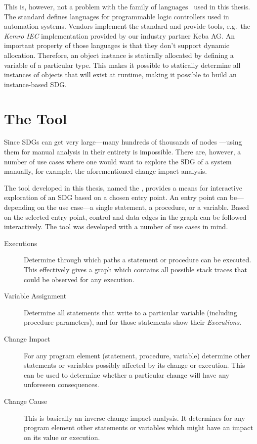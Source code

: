 This is, however, not a problem with the \IEC family of languages~\cite{IEC61131:2003} used in this thesis. The \IEC 
standard defines languages for programmable logic controllers used in automation systems. Vendors implement the 
standard and provide tools, e.g.\ the \emph{Kemro IEC} implementation provided by our industry partner Keba AG. An 
important property of those languages is that they don't support dynamic allocation. Therefore, an object instance is 
statically allocated by defining a variable of a particular type. This makes it possible to statically determine all 
instances of objects that will exist at runtime, making it possible to build an instance-based SDG.


\section{The Tool} \label{sec:intro-tool}

Since SDGs can get very large---many hundreds of thousands of nodes 
\cite[sec.~4.3]{DBLP:conf/splc/AngererPLGG14}---using them for manual analysis in their entirety is impossible. There 
are, however, a number of use cases where one would want to explore the SDG of a system manually, for example, the 
aforementioned change impact analysis.

The tool developed in this thesis, named the \emph{\SB}, provides a means for interactive exploration of an SDG based 
on a chosen entry point. An entry point can be---depending on the use case---a single statement, a procedure, or a 
variable. Based on the selected entry point, control and data edges in the graph can be followed interactively. The 
tool was developed with a number of use cases in mind.

\begin{description}
  \item[Executions] Determine through which paths a statement or procedure can be executed. This effectively gives a 
  graph which contains all possible stack traces that could be observed for any execution.
  
  \item[Variable Assignment] Determine all statements that write to a particular variable (including procedure 
  parameters), and for those statements show their \emph{Executions}.
  
  \item[Change Impact] For any program element (statement, procedure, variable) determine other statements or variables 
  possibly affected by its change or execution. This can be used to determine whether a particular change will have any 
  unforeseen consequences.
  
  \item[Change Cause] This is basically an inverse change impact analysis. It determines for any program element
  other statements or variables which might have an impact on its value or execution.
\end{description}

